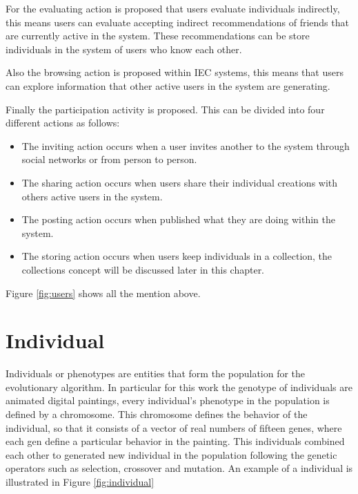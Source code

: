 For the evaluating action is proposed that users evaluate individuals
indirectly, this means users can evaluate accepting indirect recommendations of
friends that are currently active in the system. These recommendations can be
store individuals in the system of users who know each other.

Also the browsing action is proposed within IEC systems, this means that users
can explore information that other active users in the system are generating.

Finally the participation activity is proposed. This can be divided into four
different actions as follows:


\begin{itemize}
\item The inviting action occurs when a user invites another to the system through social networks or from person to person.
\item The sharing action occurs when users share their individual creations with others active users in the system.
\item The posting action occurs when published what they are doing within the system.
\item The storing action occurs when users keep individuals in a collection, the collections concept will be discussed later in this chapter.
\end{itemize}

Figure \ref{fig:users} shows all the mention above.

\section{Individual}

Individuals or phenotypes are entities that form the population for the evolutionary
algorithm. In particular for this work the genotype of individuals
are animated digital
paintings, every individual's phenotype in the population is defined by a chromosome.
This chromosome defines the behavior of the individual, so that it consists of a
vector of real numbers of fifteen genes, where each gen define a particular
behavior in the painting. This individuals combined each other to generated new
individual in the population following the genetic operators such as selection,
crossover and mutation. An example of a individual is
illustrated in Figure \ref{fig:individual}



